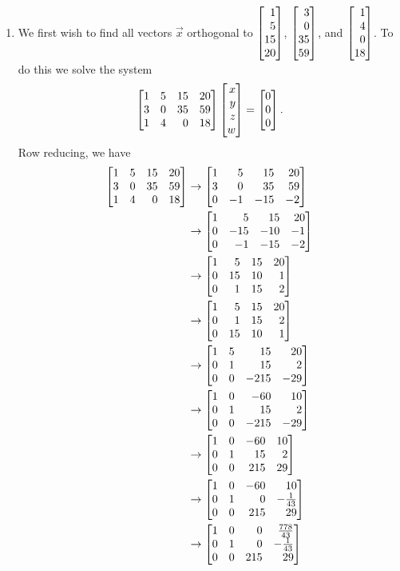 \begin{exercises}
\begin{problist}
\begin{solution}
\begin{enumerate}
					\item We first wish to find all vectors $\vec x$ orthogonal to $\mat{1\\5\\15\\20}$, $\mat{3\\0\\35\\59}$, and $\mat{1\\4\\0\\18}$. 
						To do this we solve the system \[\mat{1&5&15&20\\3&0&35&59\\1&4&0&18}\mat{x\\y\\z\\w}=\mat{0\\0\\0}.\] 
						Row reducing, we have 
						\begin{align*}
							\mat{1&5&15&20\\3&0&35&59\\1&4&0&18}&\rightarrow \mat{1&5&15&20\\3&0&35&59\\0&-1&-15&-2}\\
							&\rightarrow \mat{1&5&15&20\\0&-15&-10&-1\\0&-1&-15&-2}\\
							&\rightarrow \mat{1&5&15&20\\0&15&10&1\\0&1&15&2}\\
							&\rightarrow \mat{1&5&15&20\\0&1&15&2\\0&15&10&1}\\
							&\rightarrow \mat{1&5&15&20\\0&1&15&2\\0&0&-215&-29}\\
							&\rightarrow \mat{1&0&-60&10\\0&1&15&2\\0&0&-215&-29}\\
							&\rightarrow \mat{1&0&-60&10\\0&1&15&2\\0&0&215&29}\\
							&\rightarrow \mat{1&0&-60&10\\0&1&0&-\frac{1}{43}\\0&0&215&29}\\
							&\rightarrow \mat{1&0&0&\frac{778}{43}\\0&1&0&-\frac{1}{43}\\0&0&215&29}\\

\end{align*}
\end{enumerate}
\end{solution}
\end{problist}
\end{exercises}
